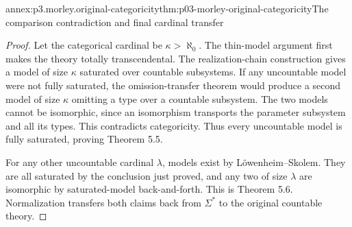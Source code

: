 \begin{annexitem}{annex:p3.morley.original-categoricity}{thm:p03-morley-original-categoricity}{The comparison contradiction and final cardinal transfer}
\begin{proof}
Let the categorical
cardinal be
\(\kappa>\aleph_0\).
The thin-model
argument first
makes the theory
totally transcendental.
The realization-chain
construction gives
a model of size
\(\kappa\) saturated
over countable subsystems.
If any uncountable
model were not
fully saturated,
the omission-transfer
theorem would produce
a second model of
size \(\kappa\)
omitting a type
over a countable
subsystem. The two
models cannot be
isomorphic, since
an isomorphism
transports the
parameter subsystem
and all its types.
This contradicts
categoricity. Thus
every uncountable
model is fully
saturated, proving
Theorem 5.5.

For any other
uncountable cardinal
\(\lambda\), models
exist by
Löwenheim--Skolem.
They are all
saturated by the
conclusion just
proved, and any
two of size
\(\lambda\) are
isomorphic by
saturated-model
back-and-forth.
This is Theorem 5.6.
Normalization
transfers both
claims back from
\(\Sigma^*\) to
the original
countable theory.
\end{proof}
\end{annexitem}

